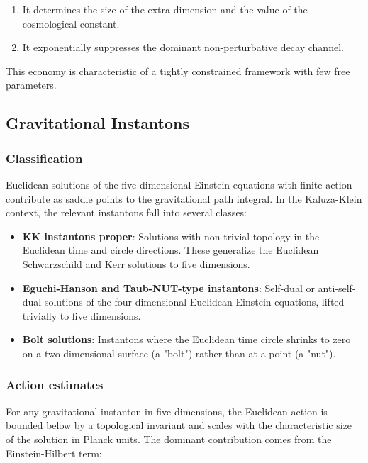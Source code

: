 \documentclass[aps,prd,preprint,superscriptaddress,longbibliography,floatfix]{revtex4-2}
\theoremstyle{remark}
\begin{document}
\begin{enumerate}
  \item It determines the size of the extra dimension and the value of the cosmological constant.
  \item It exponentially suppresses the dominant non-perturbative decay channel.
\end{enumerate}

This economy is characteristic of a tightly constrained framework with few free parameters.



\subsection{Gravitational Instantons}


\subsubsection{Classification}

Euclidean solutions of the five-dimensional Einstein equations with finite action contribute as saddle points to the gravitational path integral. In the Kaluza-Klein context, the relevant instantons fall into several classes:


\begin{itemize}
  \item \textbf{KK instantons proper}: Solutions with non-trivial topology in the Euclidean time and circle directions. These generalize the Euclidean Schwarzschild and Kerr solutions to five dimensions.
  \item \textbf{Eguchi-Hanson and Taub-NUT-type instantons}: Self-dual or anti-self-dual solutions of the four-dimensional Euclidean Einstein equations, lifted trivially to five dimensions.
  \item \textbf{Bolt solutions}: Instantons where the Euclidean time circle shrinks to zero on a two-dimensional surface (a "bolt") rather than at a point (a "nut").
\end{itemize}


\subsubsection{Action estimates}

For any gravitational instanton in five dimensions, the Euclidean action is bounded below by a topological invariant and scales with the characteristic size of the solution in Planck units. The dominant contribution comes from the Einstein-Hilbert term:
\end{document}
